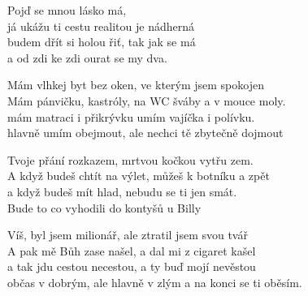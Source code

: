 
\cho{}
Pojď se mnou lásko má,\\
já ukážu ti cestu realitou je nádherná\\
budem dřít si holou řiť, tak jak se má\\
a od zdi ke zdi ourat se my dva.

\ve{}
Mám vlhkej byt bez oken, ve kterým jsem spokojen\\
Mám pánvičku, kastróly, na WC šváby a v mouce moly.\\ 
mám matraci i přikrývku umím vajíčka i polívku.\\
hlavně umím obejmout, ale nechci tě zbytečně dojmout 

\cho{}

\ve{}
Tvoje přání rozkazem, mrtvou kočkou vytřu zem.\\
A když budeš chtít na výlet, můžeš k botníku a zpět\\
a když budeš mít hlad, nebudu se ti jen smát.\\
Bude to co vyhodili do kontyšů u Billy 

\cho{}

\ve{}
Víš, byl jsem milionář, ale ztratil jsem svou tvář\\
A pak mě Bůh zase našel, a dal mi z cigaret kašel\\
a tak jdu cestou necestou, a ty buď mojí nevěstou\\
občas v dobrým, ale hlavně v zlým a na konci se ti oběsím.

\cho{}
\esong{}